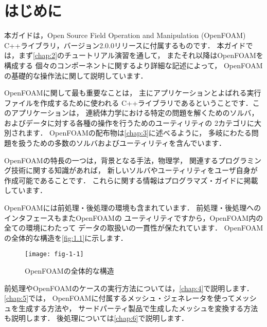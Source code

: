 \chapter{はじめに}
\label{chap:1}
本ガイドは，Open Source Field Operation and Manipulation
(OpenFOAM) C++ライブラリ，バージョン2.0.0リリースに付属するものです．
本ガイドでは，まず\autoref{chap:2}のチュートリアル演習を通して，
またそれ以降はOpenFOAMを構成する
個々のコンポーネントに関するより詳細な記述によって，
OpenFOAMの基礎的な操作法に関して説明しています．

OpenFOAMに関して最も重要なことは，
主にアプリケーションとよばれる実行ファイルを作成するために使われる
C++ライブラリであるということです．このアプリケーションは，
連続体力学における特定の問題を解くためのソルバ，
およびデータに対する各種の操作を行うためのユーティリティの
2カテゴリに大別されます．
OpenFOAMの配布物は\autoref{chap:3}に述べるように，
多岐にわたる問題を扱うための多数のソルバおよびユーティリティを含んでいます．

OpenFOAMの特長の一つは，背景となる手法，物理学，
関連するプログラミング技術に関する知識があれば，
新しいソルバやユーティリティをユーザ自身が作成可能であることです．
これらに関する情報はプログラマズ・ガイドに掲載しています．

OpenFOAMには前処理・後処理の環境も含まれています．
前処理・後処理へのインタフェースもまたOpenFOAMの
ユーティリティですから，OpenFOAM内の全ての環境にわたって
データの取扱いの一貫性が保たれています．
OpenFOAMの全体的な構造を\autoref{fig:1.1}に示します．


\begin{figure}[ht]
 \texttt{[image: fig-1-1]}
 \caption{OpenFOAMの全体的な構造}
 \label{fig:1.1}
\end{figure}


前処理やOpenFOAMのケースの実行方法については，\autoref{chap:4}で説明します．
\autoref{chap:5}では，
OpenFOAMに付属するメッシュ・ジェネレータを使ってメッシュを生成する方法や，
サードパーティ製品で生成したメッシュを変換する方法も説明します．
後処理については\autoref{chap:6}で説明します．

